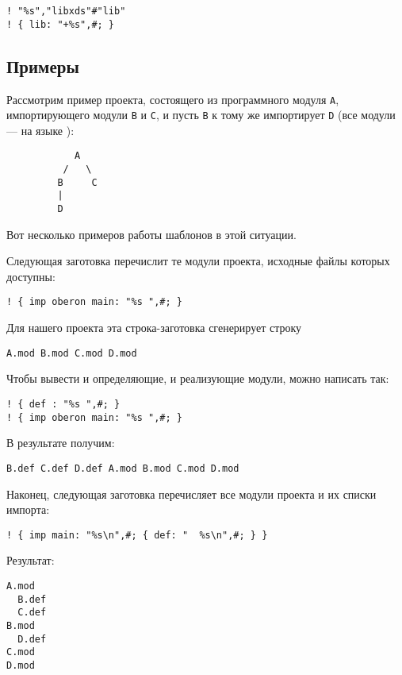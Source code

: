 \verb'! "%s","libxds"#"lib"'\\
\verb'! { lib: "+%s",#; }'

\subsection{Примеры}

Рассмотрим пример проекта, состоящего из программного модуля
{\tt A}, импортирующего модули {\tt B} и {\tt C}, и пусть
{\tt B} к тому же импортирует {\tt D} (все модули --- на языке \mt{}):
\begin{verbatim}
            A
          /   \
         B     C
         |
         D
\end{verbatim}
Вот несколько примеров работы шаблонов в этой ситуации.

Следующая заготовка перечислит те модули проекта, исходные файлы 
которых доступны:

\verb'! { imp oberon main: "%s ",#; }'

Для нашего проекта эта строка-заготовка сгенерирует строку

\verb'A.mod B.mod C.mod D.mod'

Чтобы вывести и определяющие, и реализующие модули, можно
написать так:

\verb'! { def : "%s ",#; }'\\
\verb'! { imp oberon main: "%s ",#; }'

В результате получим:

\verb'B.def C.def D.def A.mod B.mod C.mod D.mod'

Наконец, следующая заготовка перечисляет все модули проекта 
и их списки импорта:

\verb'! { imp main: "%s\n",#; { def: "  %s\n",#; } }'

Результат:

\begin{verbatim}
A.mod
  B.def
  C.def
B.mod
  D.def
C.mod
D.mod
\end{verbatim}
